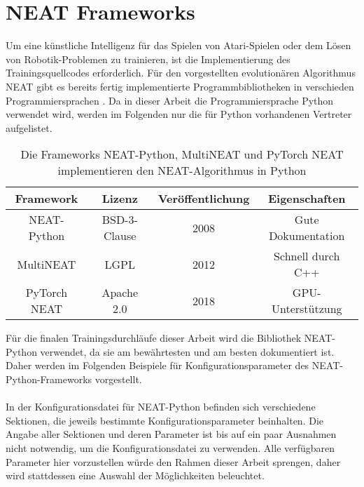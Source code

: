 \section{NEAT Frameworks}
\label{sec:frameworks}
Um eine künstliche Intelligenz für das Spielen von Atari-Spielen oder dem Lösen von Robotik-Problemen zu trainieren, ist die Implementierung des Trainingsquellcodes erforderlich. Für den vorgestellten evolutionären Algorithmus NEAT gibt es bereits fertig implementierte Programmbibliotheken in verschieden Programmiersprachen \cite{stanley2020}. Da in dieser Arbeit die Programmiersprache Python verwendet wird, werden im Folgenden nur die für Python vorhandenen Vertreter aufgelistet. 
\begin{center}
	\begin{table}
		\begin{tabular}{ |c|c|c|c| } 
			\hline
			Framework & Lizenz & Veröffentlichung & Eigenschaften \\ 
			\hline
			NEAT-Python & BSD-3-Clause & 2008 & Gute Dokumentation \\ 
			MultiNEAT & LGPL & 2012 & Schnell durch C++ \\ 
			PyTorch NEAT & Apache 2.0 & 2018 & GPU-Unterstützung \\
			\hline
		\end{tabular}
	\caption{Die Frameworks NEAT-Python, MultiNEAT und PyTorch NEAT implementieren den NEAT-Algorithmus in Python}
	\label{tab:meineTabelle}
	\end{table}
\end{center}
Für die finalen Trainingsdurchläufe dieser Arbeit wird die Bibliothek NEAT-Python verwendet, da sie am bewährtesten und am besten dokumentiert ist. Daher werden im Folgenden Beispiele für Konfigurationsparameter des NEAT-Python-Frameworks vorgestellt.
\\
\\
In der Konfigurationsdatei für NEAT-Python befinden sich verschiedene Sektionen, die jeweils bestimmte Konfigurationsparameter beinhalten. Die Angabe aller Sektionen und deren Parameter ist bis auf ein paar Ausnahmen nicht notwendig, um die Konfigurationsdatei zu verwenden. Alle verfügbaren Parameter hier vorzustellen würde den Rahmen dieser Arbeit sprengen, daher wird stattdessen eine Auswahl der Möglichkeiten beleuchtet.
